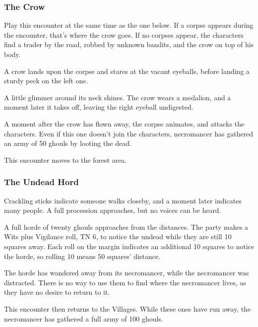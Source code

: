 \subsubsection{The Crow}

Play this encounter at the same time as the one below.  If a corpse appears during the encounter, that's where the crow goes.  If no corpses appear, the characters find a trader by the road, robbed by unknown bandits, and the crow on top of his body.

\begin{boxtext}
	A crow lands upon the corpse and stares at the vacant eyeballs, before landing a sturdy peck on the left one.

	A little glimmer around its neck shines.  The crow wears a medalion, and a moment later it takes off, leaving the right eyeball undigested.

\end{boxtext}

A moment after the crow has flown away, the corpse animates, and attacks the characters.  Even if this one doesn't join the characters, \gls{necromancer} has gathered an army of 50 ghouls by looting the dead.

\ghoul

This encounter moves to the forest area.

\subsubsection{The Undead Hord}

\begin{boxtext}
	Crackling sticks indicate someone walks closeby, and a moment later indicates many people.  A full procession approaches, but no voices can be heard.
\end{boxtext}

A full horde of twenty ghouls approaches from the distances.  The party makes a Wits plus Vigilance roll, TN 6, to notice the undead while they are still 10 squares away.  Each roll on the margin indicates an additional 10 squares to notice the horde, so rolling 10 means 50 squares' distance.

The horde has wandered away from its necromancer, while the necromancer was distracted.  There is no way to use them to find where the necromancer lives, as they have no desire to return to it.

This encounter then returns to the Villages.  While these ones have run away, the necromancer has gathered a full army of 100 ghouls.

